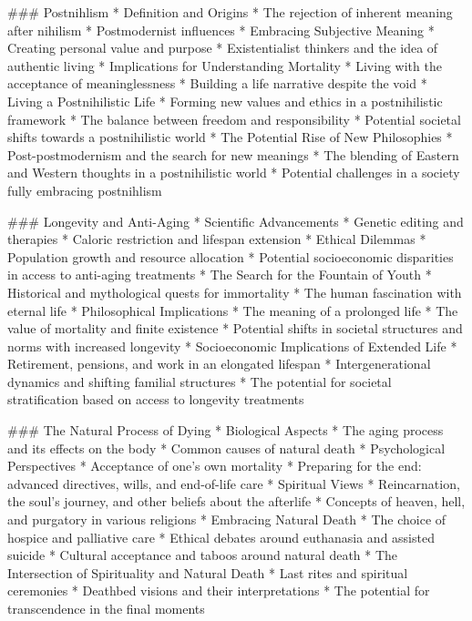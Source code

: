 ### Postnihlism
   * Definition and Origins
      * The rejection of inherent meaning after nihilism
      * Postmodernist influences
   * Embracing Subjective Meaning
      * Creating personal value and purpose
      * Existentialist thinkers and the idea of authentic living
   * Implications for Understanding Mortality
      * Living with the acceptance of meaninglessness
      * Building a life narrative despite the void
   * Living a Postnihilistic Life
      * Forming new values and ethics in a postnihilistic framework
      * The balance between freedom and responsibility
      * Potential societal shifts towards a postnihilistic world
   * The Potential Rise of New Philosophies
      * Post-postmodernism and the search for new meanings
      * The blending of Eastern and Western thoughts in a postnihilistic world
      * Potential challenges in a society fully embracing postnihlism

### Longevity and Anti-Aging
   * Scientific Advancements
      * Genetic editing and therapies
      * Caloric restriction and lifespan extension
   * Ethical Dilemmas
      * Population growth and resource allocation
      * Potential socioeconomic disparities in access to anti-aging treatments
   * The Search for the Fountain of Youth
      * Historical and mythological quests for immortality
      * The human fascination with eternal life
   * Philosophical Implications
      * The meaning of a prolonged life
      * The value of mortality and finite existence
      * Potential shifts in societal structures and norms with increased longevity
   * Socioeconomic Implications of Extended Life
      * Retirement, pensions, and work in an elongated lifespan
      * Intergenerational dynamics and shifting familial structures
      * The potential for societal stratification based on access to longevity treatments

### The Natural Process of Dying
   * Biological Aspects
      * The aging process and its effects on the body
      * Common causes of natural death
   * Psychological Perspectives
      * Acceptance of one's own mortality
      * Preparing for the end: advanced directives, wills, and end-of-life care
   * Spiritual Views
      * Reincarnation, the soul's journey, and other beliefs about the afterlife
      * Concepts of heaven, hell, and purgatory in various religions
   * Embracing Natural Death
      * The choice of hospice and palliative care
      * Ethical debates around euthanasia and assisted suicide
      * Cultural acceptance and taboos around natural death
   * The Intersection of Spirituality and Natural Death
      * Last rites and spiritual ceremonies
      * Deathbed visions and their interpretations
      * The potential for transcendence in the final moments

